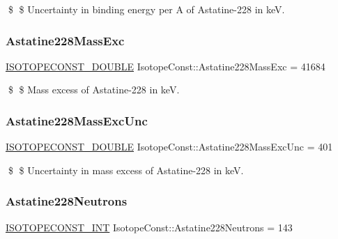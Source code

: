 \$ \$ Uncertainty in binding energy per A of Astatine-\/228 in keV. \mbox{\label{group___isotope_const-_astatine-_at228_gae26a2d048edaa243214f5557e19c9bb7}} 
\subsubsection{\texorpdfstring{Astatine228\+Mass\+Exc}{Astatine228MassExc}}
{\footnotesize\ttfamily \mbox{\hyperlink{group___isotope_const-_macros_ga8f45a7272ce02c0b4c65c44636ed719a}{I\+S\+O\+T\+O\+P\+E\+C\+O\+N\+S\+T\+\_\+\+D\+O\+U\+B\+LE}} Isotope\+Const\+::\+Astatine228\+Mass\+Exc = 41684}

\$ \$ Mass excess of Astatine-\/228 in keV. \mbox{\label{group___isotope_const-_astatine-_at228_ga34f5d2ea009faa9eec89c4b762e9672d}} 
\subsubsection{\texorpdfstring{Astatine228\+Mass\+Exc\+Unc}{Astatine228MassExcUnc}}
{\footnotesize\ttfamily \mbox{\hyperlink{group___isotope_const-_macros_ga8f45a7272ce02c0b4c65c44636ed719a}{I\+S\+O\+T\+O\+P\+E\+C\+O\+N\+S\+T\+\_\+\+D\+O\+U\+B\+LE}} Isotope\+Const\+::\+Astatine228\+Mass\+Exc\+Unc = 401}

\$ \$ Uncertainty in mass excess of Astatine-\/228 in keV. \mbox{\label{group___isotope_const-_astatine-_at228_ga8d53e32ff38b716738ac2441010deb75}} 
\subsubsection{\texorpdfstring{Astatine228\+Neutrons}{Astatine228Neutrons}}
{\footnotesize\ttfamily \mbox{\hyperlink{group___isotope_const-_macros_ga5f18360b3e99483a35c32d789e62621c}{I\+S\+O\+T\+O\+P\+E\+C\+O\+N\+S\+T\+\_\+\+I\+NT}} Isotope\+Const\+::\+Astatine228\+Neutrons = 143}

